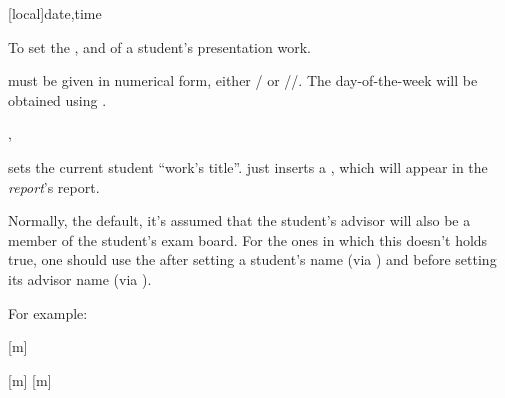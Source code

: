 \documentclass[article,nogeometry,english,tocdepth=3,secdepth=3]{ufrgscca} %
\begin{document}
\begin{codedescribe}[code,update=2023/11/29]{\timeslot}
	\begin{codesyntax}%
		\tsmacro{\timeslot}[local]{date,time}
	\end{codesyntax}
To set the ,  and  of a student's presentation work.
\end{codedescribe}

\begin{tsremark}
 must be given in numerical form, either / or //. The day-of-the-week will be obtained  using .
\end{tsremark}



\begin{codedescribe}[code,update=2023/11/18]{\worktitle,\studentremark}
	\begin{codesyntax}%
		\tsmacro{\worktitle}{title}
		\tsmacro{\studentremark}{remark}
	\end{codesyntax}
\end{codedescribe}
\tsmacro{\worktitle}{} sets the current student “work's title”. \tsmacro{\studentremark}{} just inserts a , which will appear in the \emph{report}'s report.


\begin{codedescribe}[code,update=2023/11/18]{\distinctboard}
	\begin{codesyntax}%
		\tsmacro{\distinctboard}{}
	\end{codesyntax}
Normally, the default, it's assumed that the student's advisor will also be a member of the student's exam board. For the ones in which this doesn't holds true, one should use the \tsmacro{\distinctboard}{} after setting a student's name (via \tsmacro{\student}{}) and before setting its advisor name (via \tsmacro{\advisor}{}). 
\end{codedescribe}
For example:

	\begin{codestore}[st=d.distinct]
	
		[m]

		\distinctboard
		[m]
\end{codestore}
\end{document}
